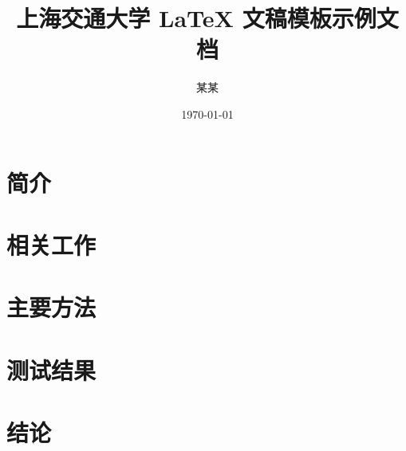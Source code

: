 \documentclass{sjtuarticle}
\title{上海交通大学 \LaTeX{} 文稿模板示例文档}
\author{某\quad{}某}
\date{\today}
\begin{document}
\maketitle

\begin{abstract}
  \zhlipsum[1]
\end{abstract}

\section{简介}

\zhlipsum[2]

\section{相关工作}

\zhlipsum[3]

\section{主要方法}

\zhlipsum[4-5]

\section{测试结果}

\zhlipsum[6]

\section{结论}

\zhlipsum[7]

\nocite{*}
\printbibliography[heading=bibintoc]
\end{document}
